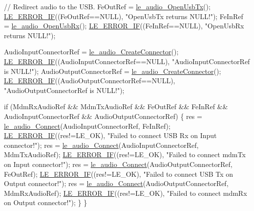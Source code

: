 \begin{DoxyCodeInclude}
{{{{{{{{{{{    \textcolor{comment}{// Redirect audio to the USB.}
    FeOutRef = \hyperlink{le__audio__interface_8h_adb38f11ac78cf99160c19f69b4db0eb8}{le\_audio\_OpenUsbTx}();
    \hyperlink{le__log_8h_aceaf11a11691d6c676e36dd317b38dbd}{LE\_ERROR\_IF}((FeOutRef==NULL), \textcolor{stringliteral}{"OpenUsbTx returns NULL!"});
    FeInRef = \hyperlink{le__audio__interface_8h_acd8be89289067cef9441a8ed1d891146}{le\_audio\_OpenUsbRx}();
    \hyperlink{le__log_8h_aceaf11a11691d6c676e36dd317b38dbd}{LE\_ERROR\_IF}((FeInRef==NULL), \textcolor{stringliteral}{"OpenUsbRx returns NULL!"});

    AudioInputConnectorRef = \hyperlink{le__audio__interface_8h_a570aaf85086f00aca592acfbaaa237be}{le\_audio\_CreateConnector}();
    \hyperlink{le__log_8h_aceaf11a11691d6c676e36dd317b38dbd}{LE\_ERROR\_IF}((AudioInputConnectorRef==NULL), \textcolor{stringliteral}{"AudioInputConnectorRef is NULL!"});
    AudioOutputConnectorRef = \hyperlink{le__audio__interface_8h_a570aaf85086f00aca592acfbaaa237be}{le\_audio\_CreateConnector}();
    \hyperlink{le__log_8h_aceaf11a11691d6c676e36dd317b38dbd}{LE\_ERROR\_IF}((AudioOutputConnectorRef==NULL), \textcolor{stringliteral}{"AudioOutputConnectorRef is NULL!"});

    \textcolor{keywordflow}{if} (MdmRxAudioRef && MdmTxAudioRef && FeOutRef && FeInRef &&
        AudioInputConnectorRef && AudioOutputConnectorRef)
    \{
        res = \hyperlink{le__audio__interface_8h_a338df65b2fb1ae0140d86880adbcf0de}{le\_audio\_Connect}(AudioInputConnectorRef, FeInRef);
        \hyperlink{le__log_8h_aceaf11a11691d6c676e36dd317b38dbd}{LE\_ERROR\_IF}((res!=LE\_OK), \textcolor{stringliteral}{"Failed to connect USB Rx on Input connector!"});
        res = \hyperlink{le__audio__interface_8h_a338df65b2fb1ae0140d86880adbcf0de}{le\_audio\_Connect}(AudioInputConnectorRef, MdmTxAudioRef);
        \hyperlink{le__log_8h_aceaf11a11691d6c676e36dd317b38dbd}{LE\_ERROR\_IF}((res!=LE\_OK), \textcolor{stringliteral}{"Failed to connect mdmTx on Input connector!"});
        res = \hyperlink{le__audio__interface_8h_a338df65b2fb1ae0140d86880adbcf0de}{le\_audio\_Connect}(AudioOutputConnectorRef, FeOutRef);
        \hyperlink{le__log_8h_aceaf11a11691d6c676e36dd317b38dbd}{LE\_ERROR\_IF}((res!=LE\_OK), \textcolor{stringliteral}{"Failed to connect USB Tx on Output connector!"});
        res = \hyperlink{le__audio__interface_8h_a338df65b2fb1ae0140d86880adbcf0de}{le\_audio\_Connect}(AudioOutputConnectorRef, MdmRxAudioRef);
        \hyperlink{le__log_8h_aceaf11a11691d6c676e36dd317b38dbd}{LE\_ERROR\_IF}((res!=LE\_OK), \textcolor{stringliteral}{"Failed to connect mdmRx on Output connector!"});
    \}
\}

}}}}}}}}}}}
\end{DoxyCodeInclude}
